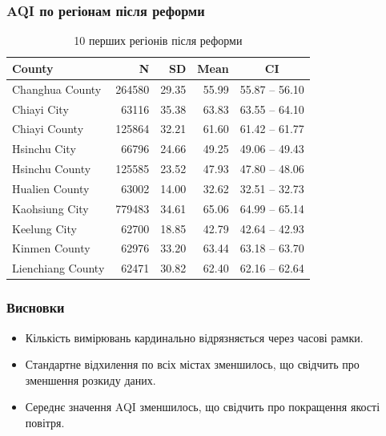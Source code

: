 \documentclass{beamer}
\begin{document}
\begin{frame}
  \frametitle{AQI по регіонам після реформи}

  \begin{table}[ht]
    \centering
    \begin{tabular}{lrrrc}
      \hline
      County            & N      & SD    & Mean  & CI \\ 
      \hline
      Changhua County   & 264580 & 29.35 & 55.99 & 55.87 -- 56.10 \\ 
      Chiayi City       & 63116  & 35.38 & 63.83 & 63.55 -- 64.10 \\ 
      Chiayi County     & 125864 & 32.21 & 61.60 & 61.42 -- 61.77 \\ 
      Hsinchu City      & 66796  & 24.66 & 49.25 & 49.06 -- 49.43 \\ 
      Hsinchu County    & 125585 & 23.52 & 47.93 & 47.80 -- 48.06 \\ 
      Hualien County    & 63002  & 14.00 & 32.62 & 32.51 -- 32.73 \\ 
      Kaohsiung City    & 779483 & 34.61 & 65.06 & 64.99 -- 65.14 \\ 
      Keelung City      & 62700  & 18.85 & 42.79 & 42.64 -- 42.93 \\ 
      Kinmen County     & 62976  & 33.20 & 63.44 & 63.18 -- 63.70 \\ 
      Lienchiang County & 62471  & 30.82 & 62.40 & 62.16 -- 62.64 \\ 
      \hline
    \end{tabular}
    \caption{10 перших регіонів після реформи} 
    \end{table}
\end{frame}

\begin{frame}
  \frametitle{Висновки}

  \begin{itemize}
    \item Кількість вимірювань кардинально відрязняється через часові рамки.
    \item Стандартне відхилення по всіх містах зменшилось, що свідчить про
    зменшення розкиду даних.
    \item Середнє значення AQI зменшилось, що свідчить про покращення якості повітря.
  \end{itemize}
\end{frame}
\end{document}
